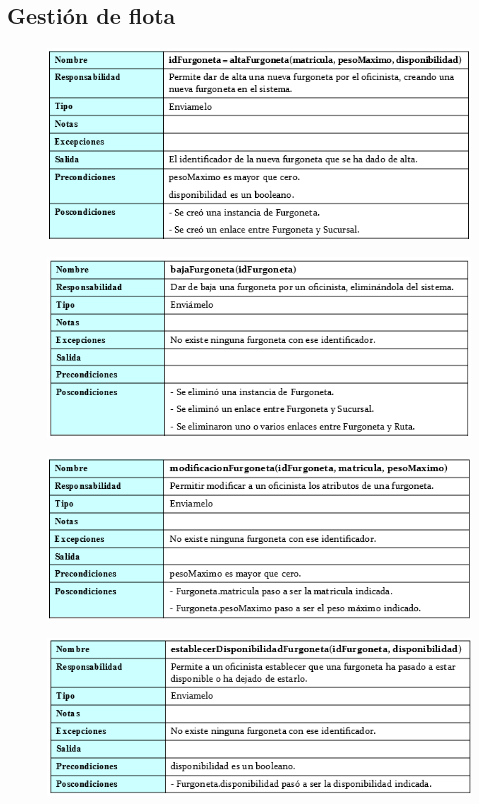 \subsection{Gestión de flota}
\begin{figure}[H]
	\centering
	\includegraphics[width=16cm]{1}
\end{figure}
\begin{figure}[H]
	\centering
	\includegraphics[width=16cm]{2}
\end{figure}
\begin{figure}[H]
	\centering
	\includegraphics[width=16cm]{3}
\end{figure}
\begin{figure}[H]
	\centering
	\includegraphics[width=16cm]{4}
\end{figure}
